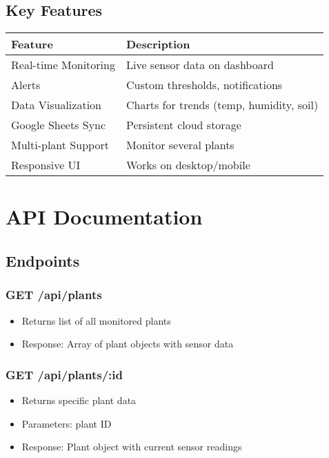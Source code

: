 \documentclass[12pt,a4paper]{article}
\begin{document}
\subsection{Key Features}
\begin{tabular}{@{}ll@{}}
\toprule
\textbf{Feature} & \textbf{Description} \\
\midrule
Real-time Monitoring & Live sensor data on dashboard \\
Alerts & Custom thresholds, notifications \\
Data Visualization & Charts for trends (temp, humidity, soil) \\
Google Sheets Sync & Persistent cloud storage \\
Multi-plant Support & Monitor several plants \\
Responsive UI & Works on desktop/mobile \\
\bottomrule
\end{tabular}

\section{API Documentation}

\subsection{Endpoints}

\subsubsection{GET /api/plants}
\begin{itemize}[leftmargin=*]
    \item Returns list of all monitored plants
    \item Response: Array of plant objects with sensor data
\end{itemize}

\subsubsection{GET /api/plants/:id}
\begin{itemize}[leftmargin=*]
    \item Returns specific plant data
    \item Parameters: plant ID
    \item Response: Plant object with current sensor readings
\end{itemize}
\end{document}

